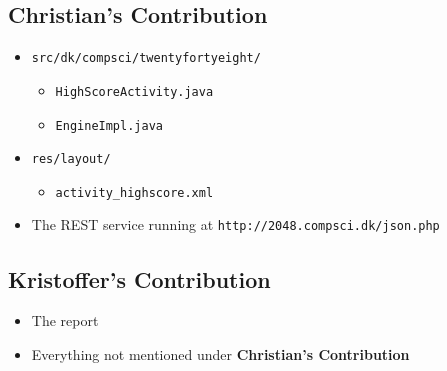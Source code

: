 \documentclass[a4paper, 12pt]{article}
\newcommand{\code}[1]{\texttt{#1}}
\begin{document}
\subsection{Christian's Contribution}
\begin{itemize}
\item \code{src/dk/compsci/twentyfortyeight/}
  \begin{itemize}
  \item \code{HighScoreActivity.java}
  \item \code{EngineImpl.java}
  \end{itemize}
\item \code{res/layout/}
  \begin{itemize}
  \item \code{activity\_highscore.xml}
  \end{itemize}
\item The REST service running at \code{http://2048.compsci.dk/json.php}
\end{itemize}
\subsection{Kristoffer's Contribution}
\begin{itemize}
\item The report
\item Everything not mentioned under \textbf{Christian's Contribution}
\end{itemize}
\end{document}
